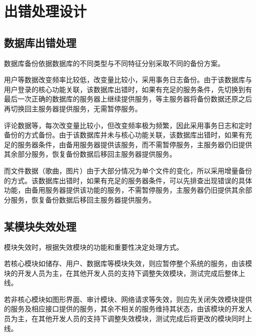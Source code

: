 \chapter{出错处理设计}
\section{数据库出错处理}

数据库备份依据数据库的不同类型与不同特征分别采取不同的备份方案。

用户等数据改变频率比较低，改变量比较小，采用事务日志备份。由于该数据库与用户登录的核心功能关联，该数据库出错时，如果有充足的服务条件，先切换到有最后一次正确的数据库的服务器上继续提供服务，等主服务器将备份数据还原之后再切换回主服务器提供服务，无需暂停服务。

评论数据等，每次改变量比较小，但改变频率极为频繁，因此采用事务日志和定时备份的方式备份。由于该数据库并未与核心功能关联，该数据库出错时，如果有充足的服务器条件，由备用服务器提供该服务，而不需暂停服务，主服务器仍旧提供其余部分服务，恢复备份数据后移回主服务器提供服务。

而文件数据（歌曲，图片）由于大部分情况为单个文件的变化，所以采用增量备份的方式。该数据库出错时，如果有充足的服务器条件，可以先排查出现错误的具体功能，由备用服务器提供该功能的服务，不需暂停服务，主服务器仍旧提供其余部分服务，恢复备份数据后移回主服务器提供服务。

\section{某模块失效处理}
模块失效时，根据失效模块的功能和重要性决定处理方式。

若核心模块如储存、用户、数据库等模块失效，则应暂停整个系统的服务，由该模块的开发人员为主，在其他开发人员的支持下调整失效模块，测试完成后整体上线。

若非核心模块如图形界面、审计模块、网络请求等失效，则应先关闭失效模块提供的服务及相应接口提供的服务，其余不相关的服务维持其状态，由该模块的开发人员为主，在其他开发人员的支持下调整失效模块，测试完成后将更改的模块同时上线。
